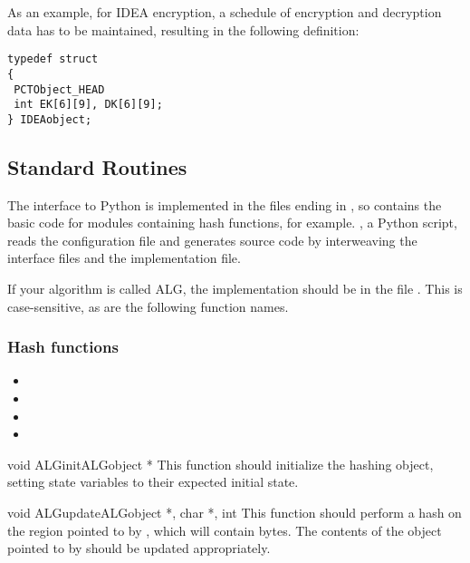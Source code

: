 \documentclass{howto}
\begin{document}
As an example, for IDEA encryption, a schedule of encryption and
decryption data has to be maintained, resulting in the following
definition:
\begin{verbatim}
typedef struct 
{
 PCTObject_HEAD
 int EK[6][9], DK[6][9];
} IDEAobject;
\end{verbatim}


\subsection{Standard Routines}

The interface to Python is implemented in the files ending in
, so  contains the basic code for modules
containing hash functions, for example.  , a Python
script, reads the configuration file and generates source code by
interweaving the interface files and the implementation file.

If your algorithm is called ALG, the implementation should be in the
file . This is case-sensitive, as are the following function
names.  

\subsubsection{Hash functions}

\begin{itemize}
\item {}
\item {}
\item {}
\item {}
\end{itemize}

\begin{funcdesc}{void ALGinit}{\rm ALGobject *}
This function should initialize the hashing object, setting 
state variables to their expected initial state.
\end{funcdesc}

\begin{funcdesc}{void ALGupdate}{\rm ALGobject *, 
char *, int }
This function should perform a hash on the region pointed to by
, which will contain  bytes.  The contents of
the object pointed to by  should be updated appropriately. 
\end{funcdesc}
\end{document}
